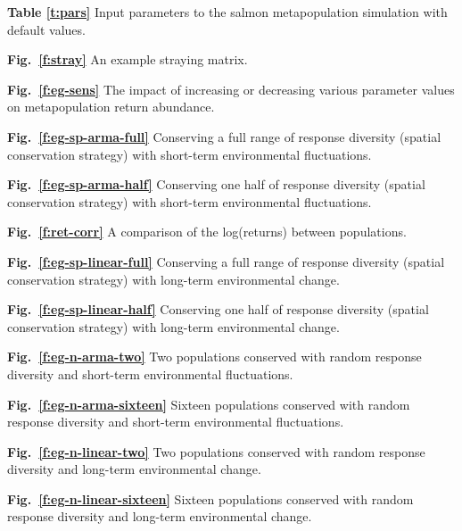 \documentclass[11pt]{article}
\begin{document}
\begin{spacing}{1.6}
\textbf{Table \ref{t:pars}}
Input parameters to the salmon metapopulation simulation with default values.

\textbf{Fig.\ \ref{f:stray}}
An example straying matrix.

\textbf{Fig.\ \ref{f:eg-sens}}
The impact of increasing or decreasing various parameter values on metapopulation return abundance.

\textbf{Fig.\ \ref{f:eg-sp-arma-full}}
Conserving a full range of response diversity (spatial conservation strategy) with short-term environmental fluctuations.

\textbf{Fig.\ \ref{f:eg-sp-arma-half}}
Conserving one half of response diversity (spatial conservation strategy) with short-term environmental fluctuations.

\textbf{Fig.\ \ref{f:ret-corr}}
A comparison of the log(returns) between populations.

\textbf{Fig.\ \ref{f:eg-sp-linear-full}}
Conserving a full range of response diversity (spatial conservation strategy) with long-term environmental change.

\textbf{Fig.\ \ref{f:eg-sp-linear-half}}
Conserving one half of response diversity (spatial
conservation strategy) with long-term environmental change.

\textbf{Fig.\ \ref{f:eg-n-arma-two}}
Two populations conserved with random response diversity and
short-term environmental fluctuations.

\textbf{Fig.\ \ref{f:eg-n-arma-sixteen}}
Sixteen populations conserved with random response diversity
and short-term environmental fluctuations.

\textbf{Fig.\ \ref{f:eg-n-linear-two}}
Two populations conserved with random response diversity and
long-term environmental change.

\textbf{Fig.\ \ref{f:eg-n-linear-sixteen}}
Sixteen populations conserved with random response diversity
and long-term environmental change.

\end{spacing}

\setlength{\parskip}{8pt}
\setlength{\parindent}{0cm}

\begin{spacing}{1.0}



\end{spacing}
\end{document}

